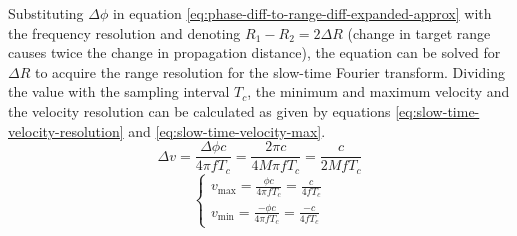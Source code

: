 Substituting $\Delta \phi$ in equation \ref{eq:phase-diff-to-range-diff-expanded-approx}
with the frequency resolution and denoting $R_1 - R_2 = 2 \Delta R$ 
(change in target range causes twice the change in propagation distance),
the equation can be solved for $\Delta R$ to acquire the range resolution
for the slow-time Fourier transform. Dividing the value with the sampling interval $T_{c}$,
the minimum and maximum velocity and the velocity resolution can be calculated as given by equations
\ref{eq:slow-time-velocity-resolution} and \ref{eq:slow-time-velocity-max}.
\begin{equation}
    \label{eq:slow-time-velocity-resolution}
    \Delta v = \frac{\Delta \phi c}{4 \pi f T_{c}} 
    = \frac{2 \pi c}{4 M \pi f T_{c}} 
    = \frac{c}{2 M f T_{c}}
\end{equation}
\begin{equation}
    \label{eq:slow-time-velocity-max}
    \begin{cases}
        v_{\mathrm{max}} = \frac{\phi c}{4 \pi f T_{c}} = \frac{c}{4 f T_{c}}\\
        v_{\mathrm{min}} = \frac{- \phi c}{4 \pi f T_{c}} = \frac{-c}{4 f T_{c}}
    \end{cases}
\end{equation}
